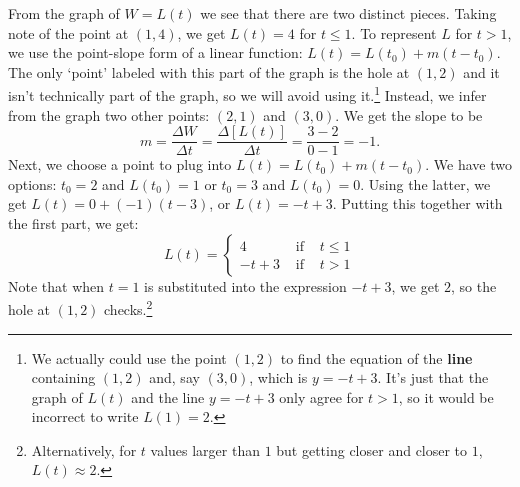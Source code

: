 \documentclass{ximera}
\begin{document}
\begin{example}
\begin{explanation} 
From the graph of $W = L(t)$ we see that there are two distinct pieces. Taking note of the point at $(1, 4)$, we get $L(t) = 4$ for $t \leq 1$.  To represent $L$ for $t>1$, we use the point-slope form of a linear function: $L(t) = L(t_0) + m(t - t_0)$.  The only `point' labeled with this part of the graph is the hole at $(1, 2)$ and it isn't technically part of the graph, so we will avoid using it.\footnote{We actually could use the point $(1, 2)$ to find the equation of the \textbf{line} containing $(1, 2)$ and, say $(3, 0)$, which is $y = -t + 3$.  It's just that the graph of $L(t)$ and the line $y = -t + 3$ only agree for $t > 1$, so it would be incorrect to write $L(1) = 2$.}  Instead, we infer from the graph two other points: $(2, 1)$ and $(3, 0)$.  We get the slope to be \[m = \frac{\Delta W}{\Delta t} = \frac{\Delta [L(t)]}{\Delta t} = \frac{3 - 2}{0 - 1} = -1.\] Next, we choose a point to plug into  $L(t) = L(t_0) + m(t - t_0)$.  We have two options:  $t_0 = 2$ and $L(t_0) = 1$ or $t_0 = 3$ and $L(t_0) = 0$.  Using the latter, we get $L(t) = 0 + (-1)(t - 3)$, or $L(t) = -t + 3$.  Putting this together with the first part, we get:
\[L(t) = \left\{ \begin{array}{rcl}  4 & \mbox{ if } & t \leq 1 \\
-t+3 & \mbox{ if } & t >1
 \end{array} \right.\]
Note that when $t = 1$ is substituted into the expression $-t + 3$, we get $2$, so the hole at $(1, 2)$ checks.\footnote{Alternatively, for $t$ values larger than $1$ but getting closer and closer to $1$, $L(t) \approx 2$.} 
\end{explanation}

\end{example}
\end{document}
